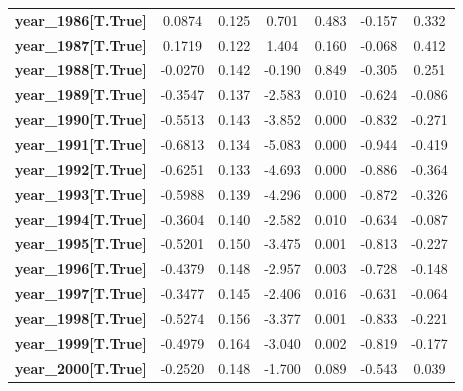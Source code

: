 \begin{center}
\begin{tabular}{lcccccc}
\textbf{year\_1986[T.True]} &       0.0874  &        0.125     &     0.701  &         0.483        &       -0.157    &        0.332     \\
\textbf{year\_1987[T.True]} &       0.1719  &        0.122     &     1.404  &         0.160        &       -0.068    &        0.412     \\
\textbf{year\_1988[T.True]} &      -0.0270  &        0.142     &    -0.190  &         0.849        &       -0.305    &        0.251     \\
\textbf{year\_1989[T.True]} &      -0.3547  &        0.137     &    -2.583  &         0.010        &       -0.624    &       -0.086     \\
\textbf{year\_1990[T.True]} &      -0.5513  &        0.143     &    -3.852  &         0.000        &       -0.832    &       -0.271     \\
\textbf{year\_1991[T.True]} &      -0.6813  &        0.134     &    -5.083  &         0.000        &       -0.944    &       -0.419     \\
\textbf{year\_1992[T.True]} &      -0.6251  &        0.133     &    -4.693  &         0.000        &       -0.886    &       -0.364     \\
\textbf{year\_1993[T.True]} &      -0.5988  &        0.139     &    -4.296  &         0.000        &       -0.872    &       -0.326     \\
\textbf{year\_1994[T.True]} &      -0.3604  &        0.140     &    -2.582  &         0.010        &       -0.634    &       -0.087     \\
\textbf{year\_1995[T.True]} &      -0.5201  &        0.150     &    -3.475  &         0.001        &       -0.813    &       -0.227     \\
\textbf{year\_1996[T.True]} &      -0.4379  &        0.148     &    -2.957  &         0.003        &       -0.728    &       -0.148     \\
\textbf{year\_1997[T.True]} &      -0.3477  &        0.145     &    -2.406  &         0.016        &       -0.631    &       -0.064     \\
\textbf{year\_1998[T.True]} &      -0.5274  &        0.156     &    -3.377  &         0.001        &       -0.833    &       -0.221     \\
\textbf{year\_1999[T.True]} &      -0.4979  &        0.164     &    -3.040  &         0.002        &       -0.819    &       -0.177     \\
\textbf{year\_2000[T.True]} &      -0.2520  &        0.148     &    -1.700  &         0.089        &       -0.543    &        0.039     \\

\end{tabular}
\end{center}
